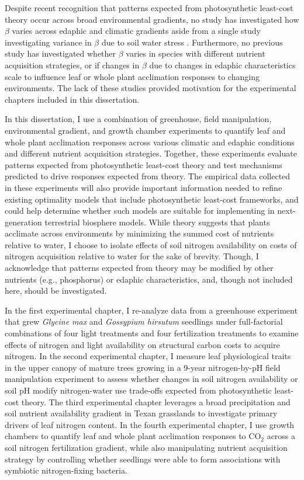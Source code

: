 Despite recent recognition that patterns expected from photosynthetic least-cost theory occur across broad environmental gradients, no study has investigated how $\beta$ varies across edaphic and climatic gradients aside from a single study investigating variance in $\beta$ due to soil water stress . Furthermore, no previous study has investigated whether $\beta$ varies in species with different nutrient acquisition strategies, or if changes in $\beta$ due to changes in edaphic characteristics scale to influence leaf or whole plant acclimation responses to changing environments. The lack of these studies provided motivation for the experimental chapters included in this dissertation.

In this dissertation, I use a combination of greenhouse, field manipulation, environmental gradient, and growth chamber experiments to quantify leaf and whole plant acclimation responses across various climatic and edaphic conditions and different nutrient acquisition strategies. Together, these experiments evaluate patterns expected from photosynthetic least-cost theory and test mechanisms predicted to drive responses expected from theory. The empirical data collected in these experiments will also provide important information needed to refine existing optimality models that include photosynthetic least-cost frameworks, and could help determine whether such models are suitable for implementing in next-generation terrestrial biosphere models. While theory suggests that plants acclimate across environments by minimizing the summed cost of nutrients relative to water, I choose to isolate effects of soil nitrogen availability on costs of nitrogen acquisition relative to water for the sake of brevity. Though, I acknowledge that patterns expected from theory may be modified by other nutrients (e.g., phosphorus) or edaphic characteristics, and, though not included here, should be investigated.

In the first experimental chapter, I re-analyze data from a greenhouse experiment that grew \textit{Glycine max} and \textit{Gossypium hirsutum} seedlings under full-factorial combinations of four light treatments and four fertilization treatments to examine effects of nitrogen and light availability on structural carbon costs to acquire nitrogen. In the second experimental chapter, I measure leaf physiological traits in the upper canopy of mature trees growing in a 9-year nitrogen-by-pH field manipulation experiment to assess whether changes in soil nitrogen availability or soil pH modify nitrogen-water use trade-offs expected from photosynthetic least-cost theory. The third experimental chapter leverages a broad precipitation and soil nutrient availability gradient in Texan grasslands to investigate primary drivers of leaf nitrogen content. In the fourth experimental chapter, I use growth chambers to quantify leaf and whole plant acclimation responses to CO$_2$ across a soil nitrogen fertilization gradient, while also manipulating nutrient acquisition strategy by controlling whether seedlings were able to form associations with symbiotic nitrogen-fixing bacteria.

